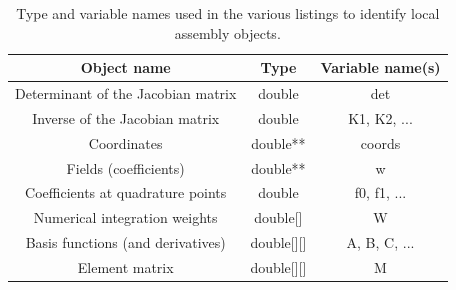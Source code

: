\begin{table}
\scriptsize
\begin{center}
\begin{tabulary}{1.0\columnwidth}{C|C|C}
\hline
Object name & Type & Variable name(s) \\\hline
Determinant of the Jacobian matrix & double & det  \\
Inverse of the Jacobian matrix & double & K1, K2, ... \\
Coordinates & double** & coords\\
Fields (coefficients) & double** & w \\
Coefficients at quadrature points & double & f0, f1, ...\\
Numerical integration weights & double[] & W \\
Basis functions (and derivatives) & double[][] & A, B, C, ... \\
Element matrix & double[][] & M\\ \hline
\end{tabulary}
\end{center}
\caption{Type and variable names used in the various listings to identify local assembly objects.}
\label{table:map-name-letters}
\end{table}


